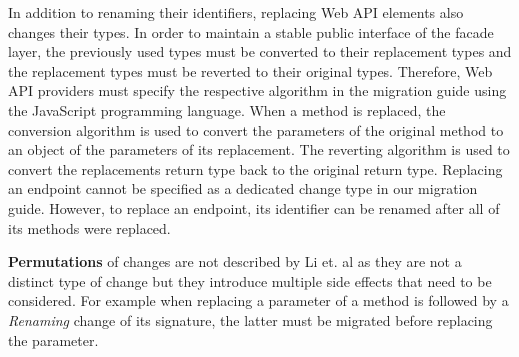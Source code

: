 In addition to renaming their identifiers, replacing Web API elements also changes their types. In order to maintain a stable public interface of the facade layer, the previously used types must be converted to their replacement types and the replacement types must be reverted to their original types. Therefore, Web API providers must specify the respective algorithm in the migration guide using the JavaScript programming language. When a method is replaced, the conversion algorithm is used to convert the parameters of the original method to an object of the parameters of its replacement. The reverting algorithm is used to convert the replacements return type back to the original return type. Replacing an endpoint cannot be specified as a dedicated change type in our migration guide. However, to replace an endpoint, its identifier can be renamed after all of its methods were replaced. 

\textbf{Permutations} of changes are not described by Li et. al \cite{li_how_2013} as they are not a distinct type of change but they introduce multiple side effects that need to be considered. For example when replacing a parameter of a method is followed by a \textit{Renaming} change of its signature, the latter must be migrated before replacing the parameter. 

